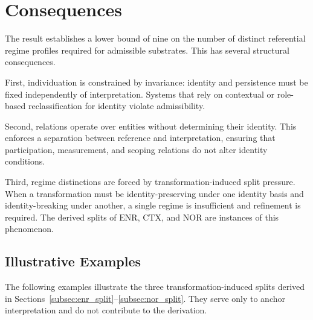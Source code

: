 
\section{Consequences}
\label{sec:consequences}

The result establishes a lower bound of nine on the number of distinct
referential regime profiles required for admissible substrates.
This has several structural consequences.

First, individuation is constrained by invariance:
identity and persistence must be fixed independently of interpretation.
Systems that rely on contextual or role-based reclassification
for identity violate admissibility.

Second, relations operate over entities without determining their identity.
This enforces a separation between reference and interpretation,
ensuring that participation, measurement, and scoping relations
do not alter identity conditions.

Third, regime distinctions are forced by transformation-induced
split pressure. When a transformation must be identity-preserving
under one identity basis and identity-breaking under another,
a single regime is insufficient and refinement is required.
The derived splits of $\mathrm{ENR}$, $\mathrm{CTX}$, and $\mathrm{NOR}$
are instances of this phenomenon.

\subsection{Illustrative Examples}
\label{subsec:examples}

The following examples illustrate the three transformation-induced
splits derived in Sections~\ref{subsec:enr_split}--\ref{subsec:nor_split}.
They serve only to anchor interpretation and do not contribute
to the derivation.

